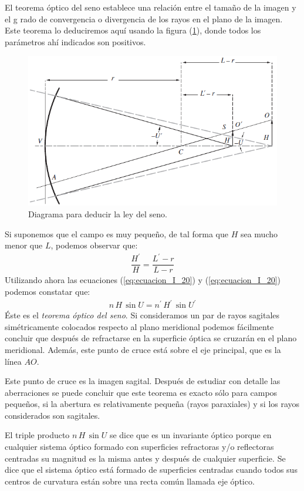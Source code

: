 \documentclass[14pt]{extarticle}
\begin{document}
El teorema óptico del seno establece una relación entre el tamaño de la imagen y el g rado de convergencia o divergencia de los rayos en el plano de la imagen. Este teorema lo deduciremos aquí usando la figura (\ref{fig:figura_17}), donde todos los parámetros ahí indicados son positivos.
\begin{figure}[H]
\centering
\includegraphics[scale=0.65]{Imagenes/Optica_Geometrica_13.png}
\caption{Diagrama para deducir la ley del seno.}
\label{fig:figura_17}
\end{figure}
Si suponemos que el campo es muy pequeño, de tal forma que $H$ sea mucho menor que $L$, podemos observar que:
\begin{align}
\dfrac{H^{\prime}}{H} = \dfrac{L^{\prime} - r}{L - r}
\label{eq:ecuacion_I_44}
\end{align}
Utilizando ahora las ecuaciones (\ref{eq:ecuacion_I_20}) y (\ref{eq:ecuacion_I_20}) podemos constatar que:
\begin{align}
n \, H \, \sin U = n^{\prime} \, H^{\prime} \, \sin U^{\prime}
\label{eq:ecuacion_I_45}
\end{align}
Éste es el \textit{teorema óptico del seno}. Si consideramos un par de rayos sagitales simétricamente colocados respecto al plano meridional podemos fácilmente concluir que después de refractarse en la superficie óptica se cruzarán en el plano meridional. Además, este punto de cruce está sobre el eje principal, que es la línea $AO$.

Este punto de cruce es la imagen sagital. Después de estudiar con detalle las aberraciones se puede concluir que este teorema es exacto sólo para campos pequeños, si la abertura es relativamente pequeña (rayos paraxiales) y si los rayos considerados son sagitales.

El triple producto $n \, H \, \sin U$ se dice que es un invariante óptico porque en cualquier sistema óptico formado con superficies refractoras y/o reflectoras centradas su magnitud es la misma antes y después de cualquier superficie. Se dice que el sistema óptico está formado de superficies centradas cuando todos sus centros de curvatura están sobre una recta común llamada eje óptico.
\end{document}
